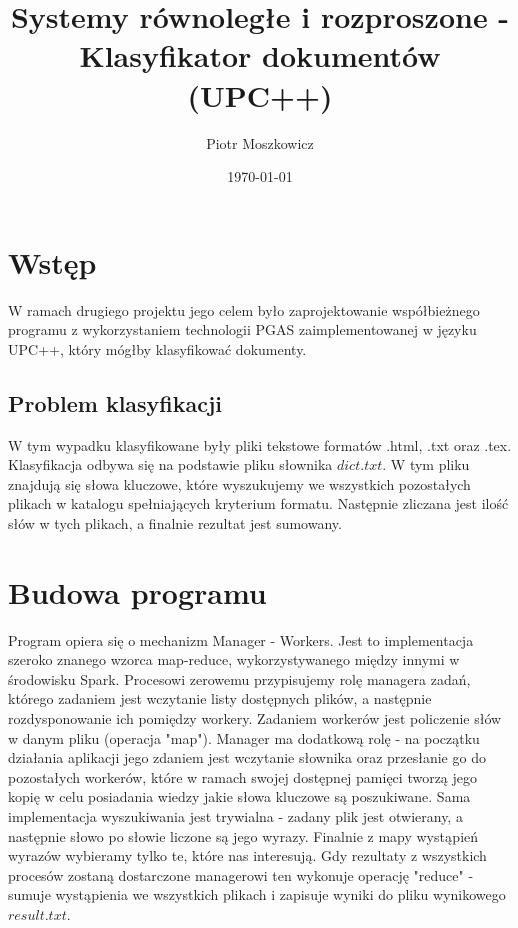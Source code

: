 \documentclass[a4paper,12pt]{article}
\begin{document}
\title{Systemy równoległe i rozproszone - Klasyfikator dokumentów (UPC++)}
\author{Piotr Moszkowicz} 
\date{\today}
\maketitle
{}

\newpage
\begin{justify}
\tableofcontents
\newpage
{}

\section{Wstęp}

W ramach drugiego projektu jego celem było zaprojektowanie współbieżnego programu z wykorzystaniem technologii PGAS zaimplementowanej w języku UPC++, który mógłby klasyfikować dokumenty.

\subsection{Problem klasyfikacji}

W tym wypadku klasyfikowane były pliki tekstowe formatów .html, .txt oraz .tex. Klasyfikacja odbywa się na podstawie pliku słownika $dict.txt$. W tym pliku znajdują się słowa kluczowe, które wyszukujemy we wszystkich pozostałych plikach w katalogu spełniających kryterium formatu. Następnie zliczana jest ilość słów w tych plikach, a finalnie rezultat jest sumowany.

\section{Budowa programu}

Program opiera się o mechanizm Manager - Workers. Jest to implementacja szeroko znanego wzorca map-reduce, wykorzystywanego między innymi w środowisku Spark. Procesowi zerowemu przypisujemy rolę managera zadań, którego zadaniem jest wczytanie listy dostępnych plików, a następnie rozdysponowanie ich pomiędzy workery. Zadaniem workerów jest policzenie słów w danym pliku (operacja "map"). Manager ma dodatkową rolę - na początku działania aplikacji jego zdaniem jest wczytanie słownika oraz przesłanie go do pozostałych workerów, które w ramach swojej dostępnej pamięci tworzą jego kopię w celu posiadania wiedzy jakie słowa kluczowe są poszukiwane. Sama implementacja wyszukiwania jest trywialna - zadany plik jest otwierany, a następnie słowo po słowie liczone są jego wyrazy. Finalnie z mapy wystąpień wyrazów wybieramy tylko te, które nas interesują. Gdy rezultaty z wszystkich procesów zostaną dostarczone managerowi ten wykonuje operację "reduce" - sumuje wystąpienia we wszystkich plikach i zapisuje wyniki do pliku wynikowego $result.txt$. 


\end{justify}
\end{document}

